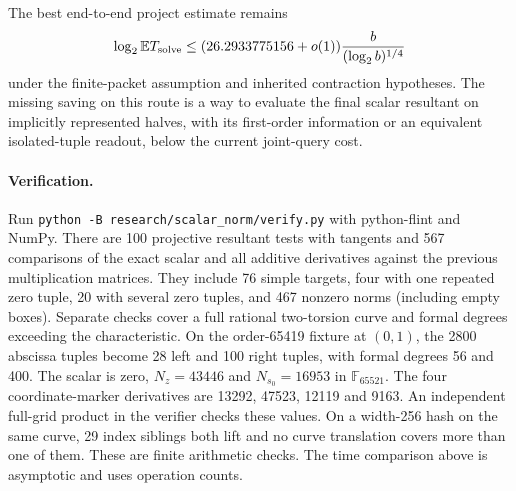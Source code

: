 \documentclass[11pt]{article}
\newcommand{\F}{\mathbb F}
\newcommand{\E}{\mathbb E}
\begin{document}
The best end-to-end project estimate remains
\[
 \log_2\E T_{\rm solve}\le(26.2933775156+o(1))
              \frac{b}{(\log_2 b)^{1/4}}
\]
under the finite-packet assumption and inherited contraction
hypotheses. The missing saving on this route is a way to evaluate
the final scalar resultant on implicitly represented halves, with
its first-order information or an equivalent isolated-tuple readout,
below the current joint-query cost.

\paragraph{Verification.}
Run \texttt{python -B research/scalar\_norm/verify.py} with
python-flint and NumPy. There are 100 projective resultant tests
with tangents and 567 comparisons of the exact scalar and all
additive derivatives against the previous multiplication matrices.
They include 76 simple targets, four with one repeated zero tuple,
20 with several zero tuples, and 467 nonzero norms (including
empty boxes). Separate checks cover a full rational two-torsion
curve and formal degrees exceeding the characteristic.
On the order-65419 fixture at $(0,1)$, the 2800 abscissa tuples
become 28 left and 100 right tuples, with formal degrees 56 and 400.
The scalar is zero, $N_z=43446$ and $N_{s_0}=16953$ in $\F_{65521}$.
The four coordinate-marker derivatives are 13292, 47523, 12119 and
9163. An independent full-grid product in the verifier checks these
values. On a width-256 hash on the same curve, 29 index siblings
both lift and no curve translation covers more than one of them.
These are finite arithmetic checks. The time comparison above is
asymptotic and uses operation counts.
\end{document}
